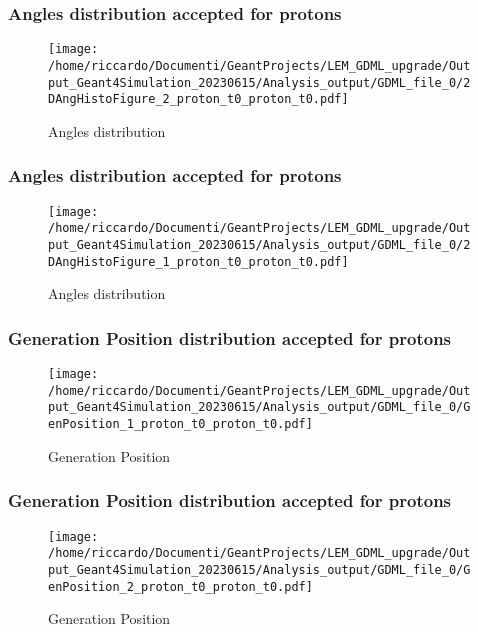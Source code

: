 \documentclass[8pt]{beamer}
\begin{document}
        \begin{frame}
            \frametitle{Angles distribution accepted for protons}
        
        \begin{figure}[h]
            \centering
            \texttt{[image: /home/riccardo/Documenti/GeantProjects/LEM\_GDML\_upgrade/Output\_Geant4Simulation\_20230615/Analysis\_output/GDML\_file\_0/2DAngHistoFigure\_2\_proton\_t0\_proton\_t0.pdf]}
            \caption{Angles distribution}
        \end{figure}
        
        \end{frame}
        
        \begin{frame}
            \frametitle{Angles distribution accepted for protons}
        
        \begin{figure}[h]
            \centering
            \texttt{[image: /home/riccardo/Documenti/GeantProjects/LEM\_GDML\_upgrade/Output\_Geant4Simulation\_20230615/Analysis\_output/GDML\_file\_0/2DAngHistoFigure\_1\_proton\_t0\_proton\_t0.pdf]}
            \caption{Angles distribution}
        \end{figure}
        
        \end{frame}
        
        \begin{frame}
            \frametitle{Generation Position distribution accepted for protons}
        
        \begin{figure}[h]
            \centering
            \texttt{[image: /home/riccardo/Documenti/GeantProjects/LEM\_GDML\_upgrade/Output\_Geant4Simulation\_20230615/Analysis\_output/GDML\_file\_0/GenPosition\_1\_proton\_t0\_proton\_t0.pdf]}
            \caption{Generation Position}
        \end{figure}
        
        \end{frame}
        
        \begin{frame}
            \frametitle{Generation Position distribution accepted for protons}
        
        \begin{figure}[h]
            \centering
            \texttt{[image: /home/riccardo/Documenti/GeantProjects/LEM\_GDML\_upgrade/Output\_Geant4Simulation\_20230615/Analysis\_output/GDML\_file\_0/GenPosition\_2\_proton\_t0\_proton\_t0.pdf]}
            \caption{Generation Position}
        \end{figure}
        
        \end{frame}
        
\end{document}
